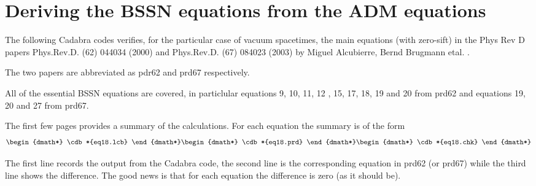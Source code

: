 \documentclass[12pt]{cdblatex}
\begin{document}















\section*{Deriving the BSSN equations from the ADM equations}

The following Cadabra codes verifies, for the particular case of vacuum spacetimes,
the main equations (with zero-sift) in the Phys Rev D papers Phys.Rev.D. (62) 044034 (2000) and
Phys.Rev.D. (67) 084023 (2003) by Miguel Alcubierre, Bernd Brugmann etal. .

The two papers are abbreviated as pdr62 and prd67 respectively.

All of the essential BSSN equations are covered, in particlular equations
9, 10, 11, 12 , 15, 17, 18, 19 and 20 from prd62 and equations 19, 20 and 27 from
prd67.

The first few pages provides a summary of the calculations. For each equation the
summary is of the form
%
\begin{dgroup*}
   \begin{dmath*} \cdb*{eq18.lcb} \end{dmath*}
   \begin{dmath*} \cdb*{eq18.prd} \end{dmath*}
   \begin{dmath*} \cdb*{eq18.chk} \end{dmath*}
\end{dgroup*}

The first line records the output from the Cadabra code, the second line is the
corresponding equation in prd62 (or prd67) while the third line shows the difference.
The good news is that for each equation the difference is zero (as it should be).
\end{document}
